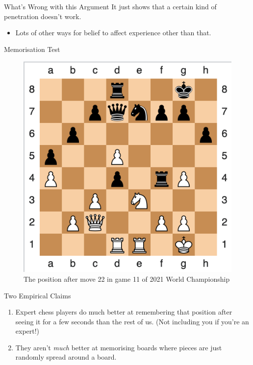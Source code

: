 \documentclass[
  17pt,
  letterpaper,
  ignorenonframetext,
  aspectratio=169,
  xcolor={dvipsnames}]{beamer}
\providecommand{\tightlist}{%
  \setlength{\itemsep}{0pt}\setlength{\parskip}{0pt}}\usepackage{longtable,booktabs,array}
\begin{document}
\begin{frame}{What's Wrong with this Argument}
\protect\hypertarget{whats-wrong-with-this-argument}{}
It just shows that a certain kind of penetration doesn't work.

\begin{itemize}[<+->]
\tightlist
\item
  Lots of other ways for belief to affect experience other than that.
\end{itemize}
\end{frame}

\begin{frame}[plain]{Memorisation Test}
\protect\hypertarget{memorisation-test}{}
\begin{figure}

{\centering \includegraphics[width=\textwidth,height=0.8\textheight]{../images/chess_gm11.png}

}

\caption{The position after move 22 in game 11 of 2021 World
Championship}

\end{figure}
\end{frame}

\begin{frame}{Two Empirical Claims}
\protect\hypertarget{two-empirical-claims}{}
\begin{enumerate}[<+->]
\tightlist
\item
  Expert chess players do much better at remembering that position after
  seeing it for a few seconds than the rest of us. (Not including you if
  you're an expert!)
\item
  They aren't \emph{much} better at memorising boards where pieces are
  just randomly spread around a board.
\end{enumerate}
\end{frame}
\end{document}
